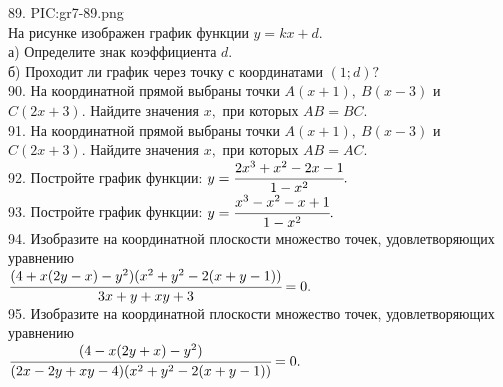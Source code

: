 89. {{PIC:gr7-89.png}}\\
На рисунке изображен график функции $y=kx+d.$\\
а) Определите знак коэффициента $d.$\\
б) Проходит ли график через точку с координатами $(1; d) ?$\\
90. На координатной прямой выбраны точки $A(x + 1),\ B(x - 3)$ и $C(2x + 3).$ Найдите значения $x,$ при которых $AB = BC.$\\
91. На координатной прямой выбраны точки $A(x + 1),\ B(x - 3)$ и $C(2x + 3).$ Найдите значения $x,$ при которых $AB = AC.$\\
92. Постройте график функции: $y=\cfrac{2x^3+x^2-2x-1}{1-x^2}.$\\
93. Постройте график функции: $y=\cfrac{x^3-x^2-x+1}{1-x^2}.$\\
94. Изобразите на координатной плоскости множество точек, удовлетворяющих уравнению \\$\cfrac{(4+x(2y-x)-y^2)(x^2+y^2-2(x+y-1))}{3x+y+xy+3}=0.$\\
95. Изобразите на координатной плоскости множество точек, удовлетворяющих уравнению \\ $\cfrac{(4-x(2y+x)-y^2)}{(2x-2y+xy-4)(x^2+y^2-2(x+y-1))}=0.$
\newpage
